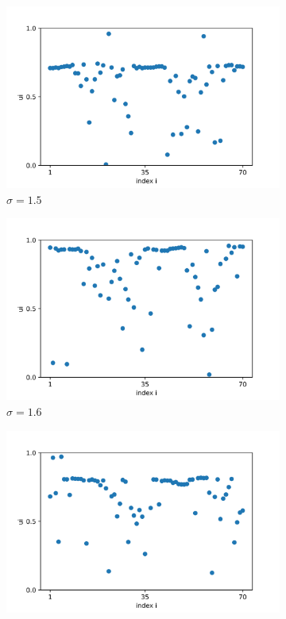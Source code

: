 \documentclass[a4paper,12pt]{article}
\begin{document}
\begin{figure}[H]
\begin{subfigure}{.32\textwidth}
  \centering
  \includegraphics[width=1\linewidth]{u_sigma=1.5.png}  
  \caption{$\sigma = 1.5$}
\end{subfigure}
\hfill
\begin{subfigure}{.32\textwidth}
  \centering
  \includegraphics[width=1\linewidth]{u_sigma=1.6.png}  
  \caption{$\sigma = 1.6$}
\end{subfigure}
\hfill
\begin{subfigure}{.32\textwidth}
  \centering
  \includegraphics[width=1\linewidth]{u_sigma=1.7.png}  

\end{subfigure}
\end{figure}
\end{document}
